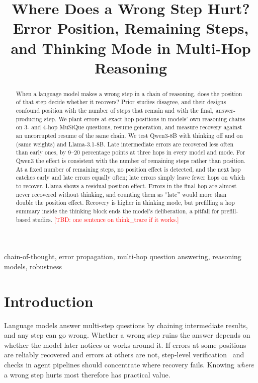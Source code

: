 \documentclass[conference]{IEEEtran}
\newcommand{\tbd}[1]{\textcolor{red}{[TBD: #1]}}
\begin{document}
\title{Where Does a Wrong Step Hurt? Error Position, Remaining Steps, and Thinking Mode in Multi-Hop Reasoning}

\author{\IEEEauthorblockN{\tbd{Authors}}
}

\maketitle

\begin{abstract}
When a language model makes a wrong step in a chain of reasoning, does the position of that step decide whether it recovers? Prior studies disagree, and their designs confound position with the number of steps that remain and with the final, answer-producing step. We plant errors at exact hop positions in models' own reasoning chains on 3- and 4-hop MuSiQue questions, resume generation, and measure recovery against an uncorrupted resume of the same chain. We test Qwen3-8B with thinking off and on (same weights) and Llama-3.1-8B.
Late intermediate errors are recovered less often than early ones, by 9--20 percentage points at three hops in every model and mode. For Qwen3 the effect is consistent with the number of remaining steps rather than position. At a fixed number of remaining steps, no position effect is detected, and the next hop catches early and late errors equally often; late errors simply leave fewer hops on which to recover. Llama shows a residual position effect.
Errors in the final hop are almost never recovered without thinking, and counting them as ``late'' would more than double the position effect. Recovery is higher in thinking mode, but prefilling a hop summary inside the thinking block ends the model's deliberation, a pitfall for prefill-based studies. \tbd{one sentence on think\_trace if it works.}
\end{abstract}

\begin{IEEEkeywords}
chain-of-thought, error propagation, multi-hop question answering, reasoning models, robustness
\end{IEEEkeywords}

\section{Introduction}
Language models answer multi-step questions by chaining intermediate results, and any step can go wrong. Whether a wrong step ruins the answer depends on whether the model later notices or works around it. If errors at some positions are reliably recovered and errors at others are not, step-level verification~\cite{lightman} and checks in agent pipelines should concentrate where recovery fails. Knowing \emph{where} a wrong step hurts most therefore has practical value.
\end{document}
